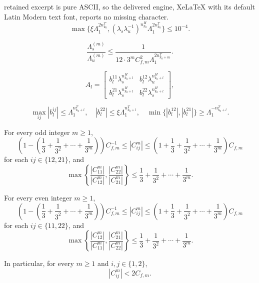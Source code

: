 \documentclass[10pt,a4paper]{amsart}
\begin{document}
retained excerpt is pure ASCII, so the delivered engine, XeLaTeX with its default Latin Modern text font, reports no missing character.
    \begin{equation}\label{eq:20251018b}
       \max\{\xi\Lambda_1^{2n_{k_0}^T},
      (\lambda_s\lambda_u^{-1})^{n_{k_0}^H}\Lambda_1^{2n_{k_0}^T}
      \}\le 10^{-4}.
    \end{equation}

    \begin{equation}\label{eq:k0decay}
        \frac{\Lambda_{s}^{(m)}}{\Lambda_{u}^{(m)}}
        \le \frac{1}{12\cdot 3^{m} C_{f,m}^{2}\Lambda_1^{2n_{k_0+m}^T}}.
    \end{equation}

\begin{equation}\label{eq:0412}
    A_l=\begin{bmatrix}
        b_l^{11}\lambda_s^{n_{k_0+l}^H} & b_l^{12}\lambda_u^{n_{k_0+l}^H}\\
        b_l^{21}\lambda_s^{n_{k_0+l}^H} & b_l^{22}\lambda_s^{n_{k_0+l}^H}
    \end{bmatrix},
\end{equation}

\begin{equation}\label{eq:1004a}
    \max_{ij}|b_l^{ij}|\le\Lambda_1^{n_{k_0+l}^T},\quad
    |b_l^{22}|\le\xi\Lambda_1^{n_{k_0+l}^T},\quad
    \min\{|b_l^{12}|,|b_l^{21}|\}\ge\Lambda_1^{-n_{k_0+l}^T}.
\end{equation}

\begin{lem}\label{lem:250404a}
For every odd integer $m\ge 1$, 
\begin{equation}\label{eq:1221-odd}
\left(1-\left(\frac{1}{3}+\frac{1}{3^2}+\cdots +\frac{1}{3^{m}}\right)\right)C_{f,m}^{-1}
\le |C_{ij}^m|
\le
\left(1+\frac{1}{3}+\frac{1}{3^2}+\cdots +\frac{1}{3^{m}}\right)C_{f,m}
\end{equation}
for each $ij\in\{12,21\}$, and
\begin{equation}\label{eq:1221-odd-ratio}
\max\left\{
\frac{|C_{11}^m|}{|C_{12}^m|},
\frac{|C_{22}^m|}{|C_{21}^m|}
\right\}
\le
\frac{1}{3}+\frac{1}{3^2}+\cdots +\frac{1}{3^{m}}.
\end{equation}

For every even integer $m\ge 1$, 
\begin{equation}\label{eq:1221-even}
\left(1-\left(\frac{1}{3}+\frac{1}{3^2}+\cdots +\frac{1}{3^{m}}\right)\right)C_{f,m}^{-1}
\le |C_{ij}^m|
\le
\left(1+\frac{1}{3}+\frac{1}{3^2}+\cdots +\frac{1}{3^{m}}\right)C_{f,m}
\end{equation}
for each $ij\in\{11,22\}$, and
\begin{equation}\label{eq:1221-even-ratio}
\max\left\{
\frac{|C_{12}^m|}{|C_{11}^m|},
\frac{|C_{21}^m|}{|C_{22}^m|}
\right\}
\le
\frac{1}{3}+\frac{1}{3^2}+\cdots +\frac{1}{3^{m}}.
\end{equation}

In particular, for every $m\ge 1$ and $i,j\in\{1,2\}$,
\[
|C_{ij}^m|<2C_{f,m}.
\]
\end{lem}
\end{document}
